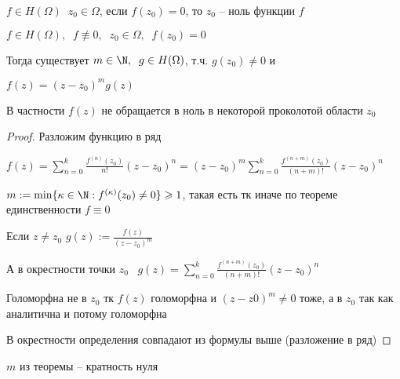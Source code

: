 
\begin{definition}\thmslashn

	$f\in H(\Omega) \;\; z_0 \in \Omega$, если $f(z_0) = 0$, то $z_0$ -- ноль функции $f$

\end{definition}

\begin{theorem}\thmslashn
	
	$f\in H(\Omega),\;\; f\not\equiv0, \;\; z_0 \in \Omega,\;\;f(z_0) = 0$
	
	Тогда существует $m \in \N, \;\; g\in H(\Omega)$, т.ч. $g(z_0)\not = 0$ и
	
	$f(z) = (z-z_0)^mg(z)$ 
	
	В частности $f(z)$ не обращается в ноль в некоторой проколотой области $z_0$
	
\end{theorem}

\begin{proof}\thmslashn
	
	Разложим функцию в ряд
	
	$f(z) = \sum\limits_{n=0}^k \frac{f^{(n)}(z_0)}{n!}(z - z_0)^n = (z-z_0)^m \sum\limits_{n=0}^k \frac{f^{(n+m)}(z_0)}{(n+m)!}(z - z_0)^n$
	
	$m:= \min\{\kappa \in \N: f^{(\kappa)}(z_0) \not = 0 \} \geqslant 1$, такая есть тк иначе по теореме единственности $f \equiv 0$
	
	Если $z \not = z_0$ $g(z) := \frac{f(z)}{(z-z_0)^m}$ 

    А в окрестности точки $z_0 \;\;\; g(z) = \sum\limits_{n=0}^k \frac{f^{(n+m)}(z_0)}{(n+m)!}(z - z_0)^n$

    Голоморфна не в $z_0$ тк $f(z)$ голоморфна и $(z-z0)^m \neq 0$ тоже, а в $z_0$ так как аналитична и потому голоморфна

    В окрестности определения совпадают из формулы выше (разложение в ряд)
	
\end{proof}

\begin{definition}\thmslashn
	
	$m$ из теоремы -- кратность нуля
	
\end{definition}

